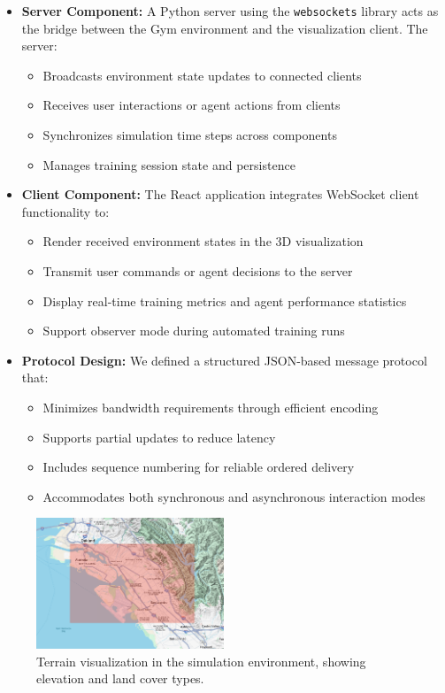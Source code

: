 \documentclass[conference]{IEEEtran}
\begin{document}
\begin{itemize}
    \item \textbf{Server Component:} A Python server using the \texttt{websockets} library acts as the bridge between the Gym environment and the visualization client. The server:
    \begin{itemize}
        \item Broadcasts environment state updates to connected clients
        \item Receives user interactions or agent actions from clients
        \item Synchronizes simulation time steps across components
        \item Manages training session state and persistence
    \end{itemize}
    
    \item \textbf{Client Component:} The React application integrates WebSocket client functionality to:
    \begin{itemize}
        \item Render received environment states in the 3D visualization
        \item Transmit user commands or agent decisions to the server
        \item Display real-time training metrics and agent performance statistics
        \item Support observer mode during automated training runs
    \end{itemize}
    
    \item \textbf{Protocol Design:} We defined a structured JSON-based message protocol that:
    \begin{itemize}
        \item Minimizes bandwidth requirements through efficient encoding
        \item Supports partial updates to reduce latency
        \item Includes sequence numbering for reliable ordered delivery
        \item Accommodates both synchronous and asynchronous interaction modes
    \end{itemize}
\end{itemize}

\begin{figure}[h!]
\centering
\includegraphics[width=0.5\textwidth]{terrain.png}
\caption{Terrain visualization in the simulation environment, showing elevation and land cover types.}
\end{figure}
\end{document}
